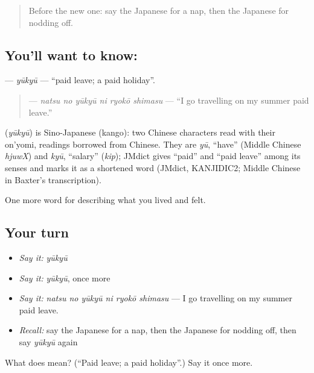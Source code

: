 \label{lesson:JA-C498-yuukyuu}



\begin{quote}
Before the new one: say the Japanese for a nap, then the Japanese for nodding off.
\end{quote}

\subsection*{You'll want to know: }
\textbf{} — \emph{yūkyū} — \textquotedblleft{}paid leave; a paid holiday\textquotedblright{}.

\begin{quote}
\textbf{  } — \emph{natsu no yūkyū ni ryokō shimasu} — \textquotedblleft{}I go travelling on my summer paid leave.\textquotedblright{}
\end{quote}

\begin{cousinweb}
\textbf{} (\emph{yūkyū}) is Sino-Japanese (kango): two Chinese characters read with their on'yomi, readings borrowed from Chinese. They are \emph{yū}, \textquotedblleft{}have\textquotedblright{} (Middle Chinese \emph{hjuwX}) and \emph{kyū}, \textquotedblleft{}salary\textquotedblright{} (\emph{kip}); JMdict gives \textquotedblleft{}paid\textquotedblright{} and \textquotedblleft{}paid leave\textquotedblright{} among its senses and marks it as a shortened word (JMdict, KANJIDIC2; Middle Chinese in Baxter's transcription).
\end{cousinweb}

\begin{grammarlens}[title={What you've built}]
One more word for describing what you lived and felt.
\end{grammarlens}

\subsection*{Your turn}
\begin{itemize}
\raggedright
  \item \emph{Say it:} \emph{yūkyū}
  \item \emph{Say it:} \emph{yūkyū}, once more
  \item \emph{Say it:} \emph{natsu no yūkyū ni ryokō shimasu} — I go travelling on my summer paid leave.
  \item \emph{Recall:} say the Japanese for a nap, then the Japanese for nodding off, then say \emph{yūkyū} again
\end{itemize}

\begin{tcolorbox}[breakable,colback=teal!4,colframe=teal!35!black,title={Before you move on}]
What does  mean? (\textquotedblleft{}Paid leave; a paid holiday\textquotedblright{}.) Say it once more.
\end{tcolorbox}
